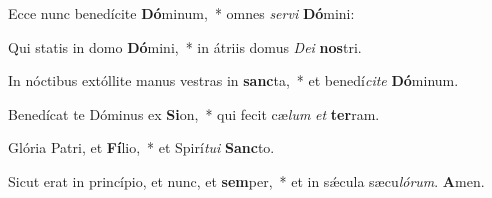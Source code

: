﻿Ecce nunc benedícite \textbf{Dó}minum,~* omnes \textit{ser}\textit{vi} \textbf{Dó}mini:

Qui statis in domo \textbf{Dó}mini,~* in átriis domus \textit{De}\textit{i} \textbf{nos}tri.

In nóctibus extóllite manus vestras in \textbf{sanc}ta,~* et benedí\textit{ci}\textit{te} \textbf{Dó}minum.

Benedícat te Dóminus ex \textbf{Si}on,~* qui fecit cæ\textit{lum} \textit{et} \textbf{ter}ram.

Glória Patri, et \textbf{Fí}lio,~* et Spirí\textit{tu}\textit{i} \textbf{Sanc}to.

Sicut erat in princípio, et nunc, et \textbf{sem}per,~* et in sǽcula sæcu\textit{ló}\textit{rum}. \textbf{A}men.